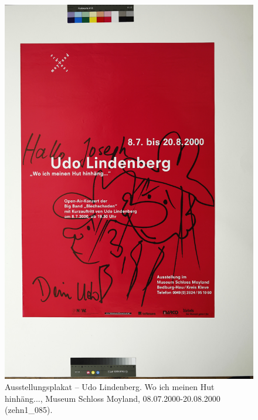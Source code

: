 \documentclass[a4paper,12pt,ngerman]{article}
\begin{document}
\newpage
\begin{figure}[ht]
\includegraphics[width=\linewidth]{Abbildung_49_(zehn1_085)}
\centering
\caption{Ausstellungsplakat -- Udo Lindenberg. Wo ich meinen Hut hinhäng..., Museum Schloss Moyland, 08.07.2000-20.08.2000 (zehn1\_085).}
\end{figure}
\end{document}
